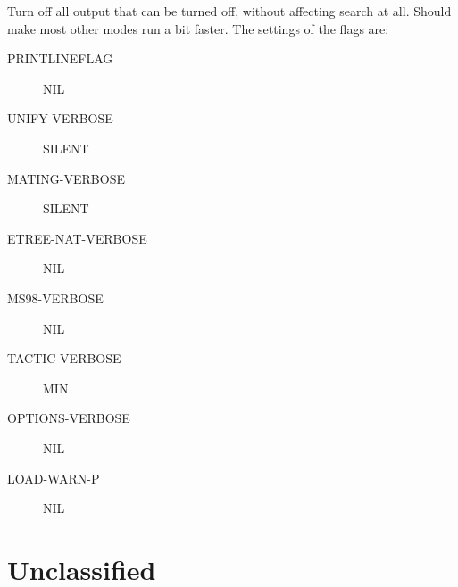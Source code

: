 \begin{description} 
\item[QUIET]  
Turn off all output that can be turned off, without affecting search
at all. Should make most other modes run a bit faster. The settings of the flags are:
\begin{description}
\item[PRINTLINEFLAG] NIL

\item[UNIFY-VERBOSE] SILENT

\item[MATING-VERBOSE] SILENT

\item[ETREE-NAT-VERBOSE] NIL

\item[MS98-VERBOSE] NIL

\item[TACTIC-VERBOSE] MIN

\item[OPTIONS-VERBOSE] NIL

\item[LOAD-WARN-P] NIL

\end{description}

\item
\end{description}

\section{Unclassified}

